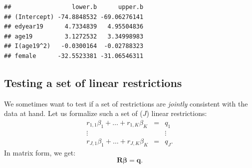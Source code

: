 \documentclass[
  12pt,
]{book}
\newenvironment{Shaded}{\begin{snugshade}}{\end{snugshade}}
\newcommand{\AttributeTok}[1]{\textcolor[rgb]{0.77,0.63,0.00}{#1}}
\newcommand{\DecValTok}[1]{\textcolor[rgb]{0.00,0.00,0.81}{#1}}
\newcommand{\FunctionTok}[1]{\textcolor[rgb]{0.00,0.00,0.00}{#1}}
\newcommand{\NormalTok}[1]{#1}
\newcommand{\OtherTok}[1]{\textcolor[rgb]{0.56,0.35,0.01}{#1}}
\newcommand{\SpecialCharTok}[1]{\textcolor[rgb]{0.00,0.00,0.00}{#1}}
\theoremstyle{definition}
\theoremstyle{definition}
\theoremstyle{definition}
\theoremstyle{definition}
\theoremstyle{remark}
\begin{document}
\begin{Shaded}
\end{Shaded}

\begin{verbatim}
##                 lower.b      upper.b
## (Intercept) -74.8848532 -69.06276141
## edyear19      4.7334839   4.95504836
## age19         3.1272532   3.34998983
## I(age19^2)   -0.0300164  -0.02788323
## female      -32.5523381 -31.06546311
\end{verbatim}

\hypertarget{Ftest}{%
\subsection{Testing a set of linear restrictions}\label{Ftest}}

We sometimes want to test if a set of restrictions are \emph{jointly} consistent with the data at hand. Let us formalize such a set of (\(J\)) linear restrictions:
\begin{equation}\label{eq:restrictions}
\begin{array}{ccc}
r_{1,1} \beta_1 + \dots + r_{1,K} \beta_K &=& q_1\\
\vdots && \vdots\\
r_{J,1} \beta_1 + \dots + r_{J,K} \beta_K &=& q_J.
\end{array}
\end{equation}
In matrix form, we get:
\begin{equation}
\mathbf{R}\boldsymbol\beta = \mathbf{q}.
\end{equation}
\end{document}
